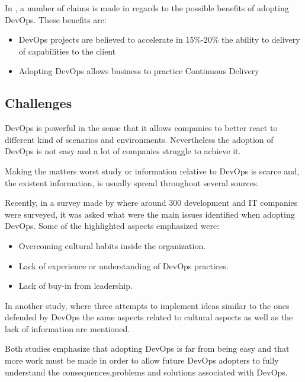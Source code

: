       In \cite{Elliot2015}, a number of claims is made in regards to the possible benefits of adopting DevOps.
      These benefits are:
		\begin{itemize}
			\item{DevOps projects are believed to accelerate in 15\%-20\% the ability to delivery of capabilities to the client }
            
            \item{Adopting DevOps allows business to practice Continuous Delivery}
		\end{itemize}
      
      
      \subsection{Challenges} \label{chap:stateoftheheart:sec:devops:challenges}
    
    	DevOps is powerful in the sense that it allows companies to better react to different kind of scenarios and environments. Nevertheless the adoption of DevOps is not easy and a lot of companies struggle to achieve it. 
    
        Making the matters worst study or information relative to DevOps is scarce \cite{SaugatuckTechnology2014} and, the existent information, is usually spread throughout several sources. 

        Recently, in a survey made by \cite{SaugatuckTechnology2014} where around 300 development and IT companies were surveyed, it was asked what were the main issues identified when adopting DevOps. Some of the highlighted aspects emphasized  were: 
        \begin{itemize}
       	    \item{Overcoming cultural habits inside the organization.}
            \item{Lack of experience or understanding of DevOps practices.}
            \item{Lack of buy-in from leadership.}
    	\end{itemize}
        
        In another study, \cite{Debois2008} where three attempts to implement ideas similar to the ones defended by DevOps the same aspects related to cultural aspects as well as the lack of information are mentioned.
        	
        Both studies emphasize that adopting DevOps is far from being easy and that more work must be made in order to allow future DevOps adopters to fully understand the consequences,problems and solutions associated with DevOps.
      


